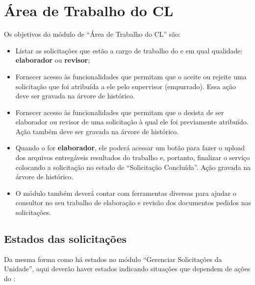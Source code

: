 \chapter{Área de Trabalho do CL}
\label{detalhes:areadetrabalho-cl}

Os objetivos do módulo de ``Área de Trabalho do CL'' são:

\begin{itemize}
	\item Listar as solicitações que estão a cargo de trabalho do \CL e em qual qualidade: \textbf{elaborador} ou \textbf{revisor};
	
	\item Fornecer acesso às funcionalidades que permitam que o \CL aceite ou rejeite uma solicitação que foi atribuída a ele pelo supervisor (empurrado). Essa ação deve ser gravada na árvore de histórico.

	\item Fornecer acesso às funcionalidades que permitam que o \CL desista de ser elaborador ou revisor de uma solicitação à qual ele foi previamente atribuído. Ação também deve ser gravada na árvore de histórico.
	
	\item Quando o \CL for \textbf{elaborador}, ele poderá acessar um botão para fazer o upload dos arquivos entregáveis resultados do trabalho e, portanto, finalizar o serviço colocando a solicitação no estado de  ``Solicitação Concluída''. Ação gravada na árvore de histórico.

	\item O módulo também deverá contar com ferramentas diversas para ajudar o consultor no seu trabalho de elaboração e revisão dos documentos pedidos nas solicitações.
\end{itemize}

\section{Estados das solicitações}

Da mesma forma como há estados no módulo ``Gerenciar Solicitações da Unidade'', aqui deverão haver estados indicando situações que dependem de ações do \CL:

